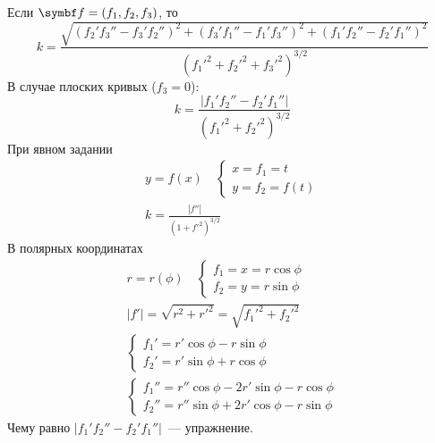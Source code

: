\documentclass[main]{subfiles}
\begin{document}
Если $\vf = (f_1, f_2, f_3)$, то
\[k = \frac{\sqrt{(f_2'f_3'' - f_3' f_2'')^2 + (f_3'f_1'' - f_1' f_3'')^2 + (f_1'f_2'' - f_2' f_1'')^2}}{(f_1'^2 + f_2'^2 + f_3'^2)^{3/2}}\]
В случае плоских кривых ($f_3 = 0$):
\[k = \frac{|f_1'f_2'' - f_2' f_1''|}{(f_1'^2 + f_2'^2)^{3/2}}\]
При явном задании
\begin{gather*}
    y = f(x) \quad \begin{cases}
        x = f_1 = t \\
        y = f_2 = f(t)
    \end{cases}\\
    k = \frac{|f''|}{(1+ f'^2)^{3/2}}
\end{gather*}
В полярных координатах
\begin{gather*}
    r = r(\phi) \quad \begin{cases}
        f_1 = x = r \cos \phi \\
        f_2 = y = r \sin \phi
    \end{cases}\\
    |f'| = \sqrt{r^2 + r'^2} = \sqrt{f_1'^2 + f_2'^2}\\
    \begin{cases}
        f_1' = r' \cos \phi - r \sin \phi \\
        f_2' = r' \sin \phi + r \cos \phi
    \end{cases}\\
    \begin{cases}
        f_1'' = r'' \cos \phi - 2 r' \sin \phi - r \cos \phi \\
        f_2'' = r'' \sin \phi + 2 r' \cos \phi - r \sin \phi
    \end{cases}
\end{gather*}
Чему равно $|f_1'f_2'' - f_2' f_1''|$~--- упражнение.
\end{document}
